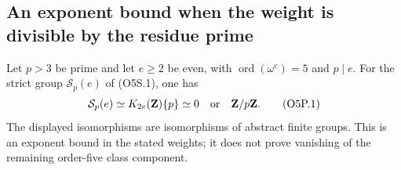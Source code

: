 \subsection{An exponent bound when the weight is divisible by the residue prime}

\begin{corollary}
Let $p>3$ be prime and let $e\ge2$ be even, with
$\operatorname{ord}(\omega^e)=5$ and $p\mid e$.
For the strict group $\mathcal S_p(e)$ of (O5S.1), one has
\[
 \mathcal S_p(e)\simeq K_{2e}(\mathbf Z)\{p\}
       \simeq0\quad\hbox{or}\quad\mathbf Z/p\mathbf Z.
                                                        \tag{O5P.1}
\]
The displayed isomorphisms are isomorphisms of abstract finite groups.
This is an exponent bound in the stated weights; it does not prove
vanishing of the remaining order-five class component.
\end{corollary}

